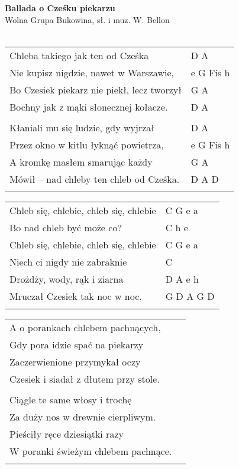 \documentclass[a5paper]{article}
\begin{document}


\noindent
\fontsize{12pt}{15pt}\selectfont
\textbf{Ballada o Cześku piekarzu} \\
\fontsize{8pt}{10pt}\selectfont
Wolna Grupa Bukowina, sł. i muz. W. Bellon \\ \\
\fontsize{10pt}{12pt}\selectfont
{}
\begin{tabular}{@{}p{8.5cm}p{3cm}@{}}
\noindent
Chleba takiego jak ten od Cześka & D A \\
Nie kupisz nigdzie, nawet w Warszawie, & e G Fis h \\
Bo Czesiek piekarz nie piekł, lecz tworzył & G A \\
Bochny jak z mąki słonecznej kołacze. & D A \\ \\

Kłaniali mu się ludzie, gdy wyjrzał & D A \\
Przez okno w kitlu łyknąć powietrza, & e G Fis h \\
A kromkę masłem smarując każdy & G A \\
Mówił – nad chleby ten chleb od Cześka. & D A D\\ \\
\end{tabular}

\noindent
\begin{tabular}{@{}p{7.5cm}p{3cm}@{}}
Chleb się, chlebie, chleb się, chlebie & C G e a \\
Bo nad chleb być może co? & C h e \\
Chleb się, chlebie, chleb się, chlebie & C G e a \\
Niech ci nigdy nie zabraknie & C \\
Drożdży, wody, rąk i ziarna & D A e h \\
Mruczał Czesiek tak noc w noc. & G D A G D \\ \\
\end{tabular}

\noindent
\begin{tabular}{@{}p{8.5cm}p{3cm}@{}}
A o porankach chlebem pachnących, \\
Gdy pora idzie spać na piekarzy \\
Zaczerwienione przymykał oczy \\
Czesiek i siadał z dłutem przy stole. \\ \\
 
Ciągle te same włosy i trochę \\
Za duży nos w drewnie cierpliwym. \\
Pieściły ręce dziesiątki razy \\
W poranki świeżym chlebem pachnące. \\ \\
\end{tabular}
\end{document}
